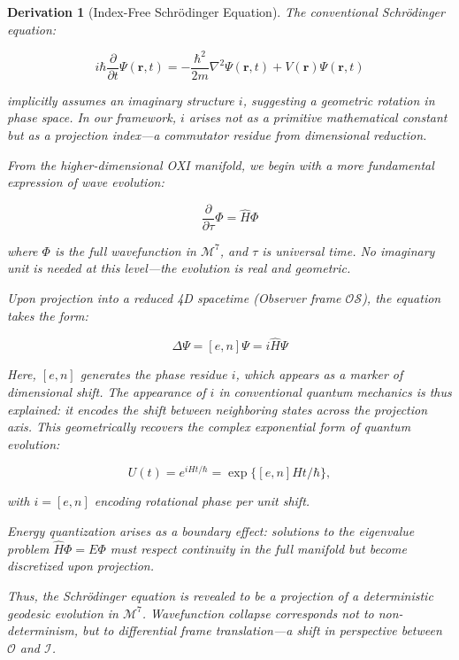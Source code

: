 \documentclass{article}
\newtheorem{derivation}{Derivation}
\begin{document}
\begin{derivation}[Index-Free Schr\"odinger Equation]
The conventional Schr\"odinger equation:

\begin{equation}
i\hbar\frac{\partial}{\partial t}\Psi(\mathbf{r},t) = -\frac{\hbar^2}{2m}\nabla^2\Psi(\mathbf{r},t) + V(\mathbf{r})\Psi(\mathbf{r},t)
\end{equation}

implicitly assumes an imaginary structure \( i \), suggesting a geometric rotation in phase space. In our framework, \( i \) arises not as a primitive mathematical constant but as a \textit{projection index}---a commutator residue from dimensional reduction.

From the higher-dimensional OXI manifold, we begin with a more fundamental expression of wave evolution:

\begin{equation}
\frac{\partial}{\partial \tau}\Phi = \hat{H}\Phi
\end{equation}

where \( \Phi \) is the full wavefunction in \( \mathcal{M}^7 \), and \( \tau \) is universal time. No imaginary unit is needed at this level---the evolution is real and geometric.

Upon projection into a reduced 4D spacetime (Observer frame \( \mathcal{OS} \)), the equation takes the form:

\begin{equation}
\Delta \Psi = [e, n]\Psi = i \hat{H} \Psi
\end{equation}

Here, \( [e, n] \) generates the phase residue \( i \), which appears as a marker of dimensional shift. The appearance of \( i \) in conventional quantum mechanics is thus explained: it encodes the shift between neighboring states across the projection axis. This geometrically recovers the complex exponential form of quantum evolution:

\begin{equation}
U(t) = e^{iHt/\hbar} = \exp\{[e, n] Ht / \hbar\},
\end{equation}

with \( i = [e, n] \) encoding rotational phase per unit shift.

Energy quantization arises as a boundary effect: solutions to the eigenvalue problem \( \hat{H}\Phi = E\Phi \) must respect continuity in the full manifold but become discretized upon projection.

Thus, the Schr\"odinger equation is revealed to be a projection of a deterministic geodesic evolution in \( \mathcal{M}^7 \). Wavefunction collapse corresponds not to non-determinism, but to differential frame translation---a shift in perspective between \( \mathcal{O} \) and \( \mathcal{I} \).
\end{derivation}
\end{document}
